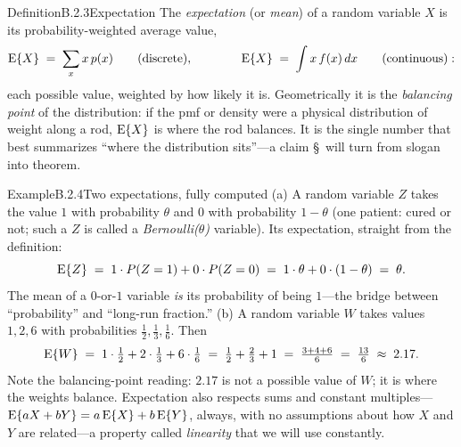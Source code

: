 \documentclass[main.tex]{subfiles}
\begin{document}
\begin{Obj}{Definition}{B.2.3}{Expectation}
The \emph{expectation} (or \emph{mean}) of a random variable $X$ is its
probability-weighted average value,
\[ \mathrm{E}\{X\} \;=\; \sum_x x\, p(x) \qquad\text{(discrete)}, \qquad\qquad
   \mathrm{E}\{X\} \;=\; \int x\, f(x)\, dx \qquad\text{(continuous)} : \]
each possible value, weighted by how likely it is. Geometrically it is the \emph{balancing
point} of the distribution: if the pmf or density were a physical distribution of weight
along a rod, $\mathrm{E}\{X\}$ is where the rod balances. It is the single number that best
summarizes ``where the distribution sits''---a claim \S\, will turn from slogan
into theorem.
\end{Obj}

\begin{ObjL}{Example}{B.2.4}{Two expectations, fully computed}
(a) A random variable $Z$ takes the value $1$ with probability $\theta$ and $0$ with
probability $1-\theta$ (one patient: cured or not; such a $Z$ is called a
\emph{Bernoulli($\theta$)} variable). Its expectation, straight from the definition:
\[ \mathrm{E}\{Z\} \;=\; 1\cdot P(Z=1) + 0\cdot P(Z=0) \;=\; 1\cdot\theta + 0\cdot(1-\theta)
   \;=\; \theta . \]
The mean of a $0$-or-$1$ variable \emph{is} its probability of being $1$---the bridge
between ``probability'' and ``long-run fraction.''
(b) A random variable $W$ takes values $1, 2, 6$ with probabilities
$\tfrac12, \tfrac13, \tfrac16$. Then
\[ \mathrm{E}\{W\} \;=\; 1\cdot\tfrac12 + 2\cdot\tfrac13 + 6\cdot\tfrac16
   \;=\; \tfrac12 + \tfrac23 + 1 \;=\; \tfrac{3+4+6}{6} \;=\; \tfrac{13}{6}
   \;\approx\; 2.17 . \]
Note the balancing-point reading: $2.17$ is not a possible value of $W$; it is where the
weights balance. Expectation also respects sums and constant multiples---%
$\mathrm{E}\{aX+bY\}=a\,\mathrm{E}\{X\}+b\,\mathrm{E}\{Y\}$, always, with no assumptions about how $X$ and $Y$ are
related---a property called \emph{linearity} that we will use constantly.
\end{ObjL}
\end{document}
